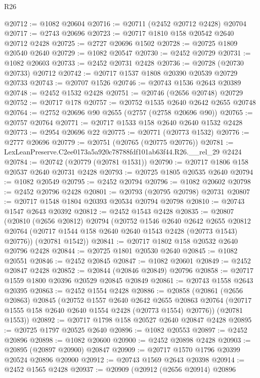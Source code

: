 \begin{lexlean}{R26}
\begin{coremodule}
@20712 := @1082 @20604
@20716 := @20711 (@2452 @20712 @2428) @20704
@20717 := @2743 @20696
@20723 := @20717 @1810 @158 @20542 @2640 @20712 @2428
@20725 := @2727 @20696 @1502
@20728 := @20725 @1809 @20540 @2640
@20729 := @1082 @20547
@20730 := @2452 @20729
@20731 := @1082 @20603
@20733 := @2452 @20731 @2428
@20736 := @20728 (@20730 @20733) @20712
@20742 := @20717 @1537 @1808 @20390 @20539 @20729 @20733
@20743 := @20707 @1526
@20746 := @20743 @1536 @2643 @20389
@20748 := @2452 @1532 @2428
@20751 := @20746 (@2656 @20748) @20729
@20752 := @20717 @178
@20757 := @20752 @1535 @2640 @2642 @2655 @20748
@20764 := @2752 @20696 @90 @2655 (@2757 (@2758 @20696 @90))
@20765 := @20757 @20764
@20771 := @20717 @1533 @158 @2640 @2640 @1532 @2428
@20773 := @2954 @20696 @22
@20775 := @20771 (@20773 @1532)
@20776 := @2777 @20696
@20779 := @20751 (@20765 (@20775 @20776))
@20781 := LexLeanPreserve.C2ee0173a5a920c78788fdf101ab63f44.R26.__rel_29 @2424
@20784 := @20742 (@20779 (@20781 @1531))
@20790 := @20717 @1806 @158 @20537 @2640 @20731 @2428
@20793 := @20725 @1805 @20535 @2640
@20794 := @1082 @20549
@20795 := @2452 @20794
@20796 := @1082 @20602
@20798 := @2452 @20796 @2428
@20801 := @20793 (@20795 @20798) @20731
@20807 := @20717 @1548 @1804 @20393 @20534 @20794 @20798
@20810 := @20743 @1547 @2643 @20392
@20812 := @2452 @1543 @2428
@20835 := @20807
    (@20810
      (@2656 @20812)
      @20794
      (@20752
        @1546
        @2640
        @2642
        @2655
        @20812
        @20764
        (@20717 @1544 @158 @2640 @2640 @1543 @2428 (@20773 @1543) @20776))
      (@20781 @1542))
@20841 := @20717 @1802 @158 @20532 @2640 @20796 @2428
@20844 := @20725 @1801 @20530 @2640
@20845 := @1082 @20551
@20846 := @2452 @20845
@20847 := @1082 @20601
@20849 := @2452 @20847 @2428
@20852 := @20844 (@20846 @20849) @20796
@20858 := @20717 @1559 @1800 @20396 @20529 @20845 @20849
@20861 := @20743 @1558 @2643 @20395
@20863 := @2452 @1554 @2428
@20886 := @20858
    (@20861
      (@2656 @20863)
      @20845
      (@20752
        @1557
        @2640
        @2642
        @2655
        @20863
        @20764
        (@20717 @1555 @158 @2640 @2640 @1554 @2428 (@20773 @1554) @20776))
      (@20781 @1553))
@20892 := @20717 @1798 @158 @20527 @2640 @20847 @2428
@20895 := @20725 @1797 @20525 @2640
@20896 := @1082 @20553
@20897 := @2452 @20896
@20898 := @1082 @20600
@20900 := @2452 @20898 @2428
@20903 := @20895 (@20897 @20900) @20847
@20909 := @20717 @1570 @1796 @20399 @20524 @20896 @20900
@20912 := @20743 @1569 @2643 @20398
@20914 := @2452 @1565 @2428
@20937 := @20909
    (@20912
      (@2656 @20914)
      @20896

\end{coremodule}
\end{lexlean}
